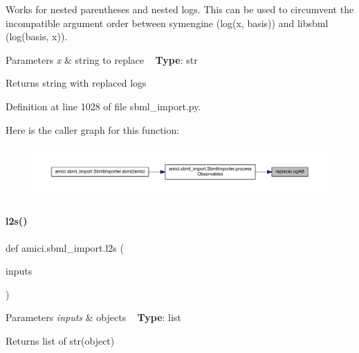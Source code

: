 Works for nested parentheses and nested \textquotesingle{}log\textquotesingle{}s. This can be used to circumvent the incompatible argument order between symengine (log(x, basis)) and libsbml (log(basis, x)).


\begin{DoxyParams}{Parameters}
{\em x} & string to replace ~\newline
{\bfseries{Type}}\+: str\\
\hline
\end{DoxyParams}
\begin{DoxyReturn}{Returns}
string with replaced \textquotesingle{}log\textquotesingle{}s 
\end{DoxyReturn}


Definition at line 1028 of file sbml\+\_\+import.\+py.

Here is the caller graph for this function\+:
\nopagebreak
\begin{figure}[H]
\begin{center}
\leavevmode
\includegraphics[width=350pt]{namespaceamici_1_1sbml__import_a178c633ce1bc7f2af378ce56bd404541_icgraph}
\end{center}
\end{figure}
\mbox{\label{namespaceamici_1_1sbml__import_a6bff3fedaa877c35e5ea7bc112ec4adf}} 
\paragraph{\texorpdfstring{l2s()}{l2s()}}
{\footnotesize\ttfamily def amici.\+sbml\+\_\+import.\+l2s (\begin{DoxyParamCaption}\item[{}]{inputs }\end{DoxyParamCaption})}


\begin{DoxyParams}{Parameters}
{\em inputs} & objects ~\newline
{\bfseries{Type}}\+: list\\
\hline
\end{DoxyParams}
\begin{DoxyReturn}{Returns}
list of str(object) 
\end{DoxyReturn}


